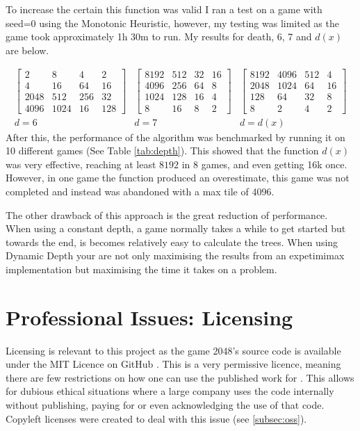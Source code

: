 \documentclass{article}
\begin{document}
To increase the certain this function was valid I ran a test on a game with seed=0 using the Monotonic Heuristic, however, my testing was limited as the game took approximately 1h 30m to run. My results for death, 6, 7 and $d(x)$ are below.

\[
\begin{matrix}
\begin{bmatrix}
    2&8&4&2 \\
    4&16&64&16 \\
    2048&512&256&32\\ 
    4096&1024&16&128 
\end{bmatrix}&
\begin{bmatrix}
    8192&512&32&16 \\
    4096&256&64&8 \\
    1024&128&16&4 \\
    8&16&8&2 
\end{bmatrix}&
\begin{bmatrix}
    8192&4096&512&4\\
    2048&1024&64&16\\
    128&64&32&8\\
    8&2&4&2
\end{bmatrix}
\\
d=6&d=7&d=d(x)
\end{matrix}
\]
After this, the performance of the algorithm was benchmarked by running it on 10 different games (See Table \ref{tab:depth}). This showed that the function $d(x)$ was very effective, reaching at least $8192$ in $8$ games, and even getting 16k once. However, in one game the function produced an overestimate, this game was not completed and instead was abandoned with a max tile of 4096.

The other drawback of this approach is the great reduction of performance. When using a constant depth, a game normally takes a while to get started but towards the end, is becomes relatively easy to calculate the trees. When using Dynamic Depth your are not only maximising the results from an expetimimax implementation but maximising the time it takes on a problem.
\section{Professional Issues: Licensing}
\label{sec:prof_issues}
Licensing is relevant to this project as the game 2048's source code is available under the MIT Licence on GitHub \cite{source2048}. This is a very permissive licence, meaning there are few restrictions on how one can use the published work for \cite{osi_faq}. This allows for dubious ethical situations where a large company uses the code internally without publishing, paying for or even acknowledging the use of that code. Copyleft licenses were created to deal with this issue (see \ref{subsec:oss}).
\end{document}
